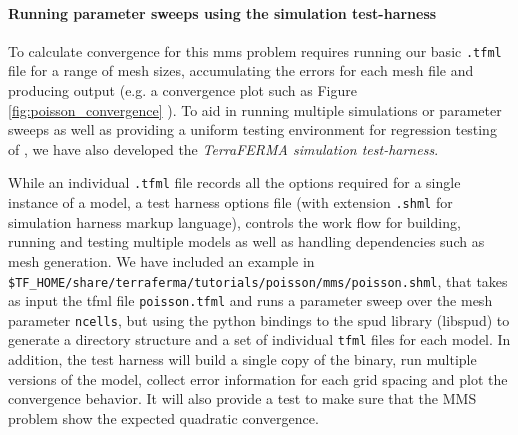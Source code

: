 \paragraph{Running parameter sweeps using the simulation test-harness}
\label{sec:runn-param-sweeps}

To calculate convergence for this mms problem requires running our
basic \texttt{.tfml} file for a range of mesh sizes, accumulating the
errors for each mesh file and producing output (e.g. a convergence
plot such as Figure \ref{fig:poisson_convergence} ).  To aid in
running multiple simulations or parameter sweeps as well as providing
a uniform testing environment for regression testing of \TF,  we have
also developed the \emph{TerraFERMA simulation test-harness}. 

While an individual \texttt{.tfml} file records all the options
required for a single instance of a model, a test harness options file
(with extension
\texttt{.shml}  for simulation harness markup language), controls the
work flow for building, running and testing multiple models as well as
handling dependencies such as mesh generation.   We have included an example in
\texttt{\$TF\_HOME/share/terraferma/tutorials/poisson/mms/poisson.shml},
that takes as input  the tfml file \texttt{poisson.tfml}  and runs a
parameter sweep over the mesh parameter \texttt{ncells}, but using the
python bindings to the spud library (libspud) to generate a directory
structure and a set of individual \texttt{tfml} files for each model.
In addition,  the test harness will build a single copy of the binary,
run multiple versions of the model,  collect error information for
each grid spacing and plot the convergence behavior.  It will also
provide a test to make sure that the  MMS problem show the expected
quadratic convergence.

